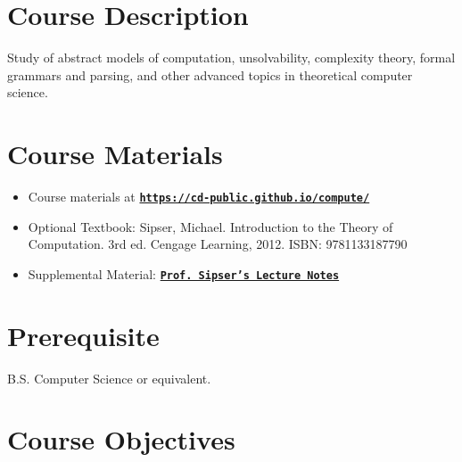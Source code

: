 \documentclass[11pt]{article}
\begin{document}

\section*{Course Description}

Study of abstract models of computation, unsolvability, complexity theory, formal grammars and parsing, and other advanced topics in theoretical computer science.


\section*{Course Materials}

\begin{itemize}
\item Course materials at \href{https://cd-public.github.io/compute/}{\tt\bf https://cd-public.github.io/compute/}
\item Optional Textbook: Sipser, Michael. Introduction to the Theory of Computation. 3rd ed. Cengage Learning, 2012. ISBN: 9781133187790
\item Supplemental Material: \href{https://ocw.mit.edu/courses/18-404j-theory-of-computation-fall-2020/pages/lecture-notes/}{\tt\bf Prof. Sipser's Lecture Notes}
\end{itemize}


\section*{Prerequisite}
B.S. Computer Science or equivalent.


\section*{Course Objectives}
\end{document}
